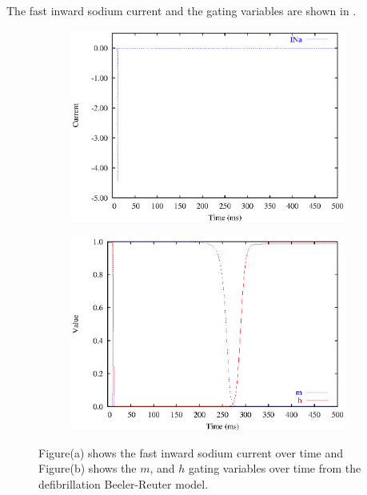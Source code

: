 The fast inward sodium current and the gating variables are shown in
.
\begin{figure}[hbtp] 
  \centering
  \begin{subfigure}[b]{0.45\linewidth}
    \centering
    \includegraphics[width=\textwidth]{cardiac_electrophysiology/epsfiles/BRDR_INa.eps}
    \caption{}
  \end{subfigure}
  \hfill
  \begin{subfigure}[b]{0.45\linewidth}
    \centering
    \includegraphics[width=\textwidth]{cardiac_electrophysiology/epsfiles/BRDR_mh.eps}
    \caption{}
  \end{subfigure}
  \caption[Fast inward sodium current from the defibrillation Beeler-Reuter
  model]{Figure(a) shows the 
    fast inward sodium current over time and Figure(b) shows the $m$, and $h$
    gating variables over time from the defibrillation Beeler-Reuter model.}
  \label{fig:BRDR_NA_traces}
\end{figure}
%
